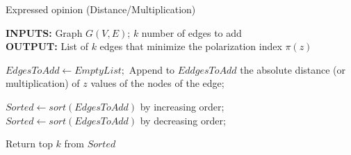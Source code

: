 \begin{algorithm}[H]
	\caption{Expressed opinion (Distance/Multiplication)}
	\label{alg:expreDisMiss}
	
	\begin{flushleft}
        		\textbf{INPUTS:} Graph $G(V, E)$; $k$ number of edges to add\\
		\vspace{6pt}
        		\textbf{OUTPUT:} List of $k$ edges that minimize the polarization index $\pi(z)$
	\end{flushleft}
	
	\begin{algorithmic}[1]
		\STATE $EdgesToAdd \leftarrow Empty List;$
			\STATE Append to $EddgesToAdd$ the absolute distance (or multiplication) of $z$ values of the nodes of the edge;
		\ENDFOR
		
			\STATE $Sorted \leftarrow sort(EdgesToAdd)$ by increasing order;
		\ELSE 
			\STATE $Sorted \leftarrow sort(EdgesToAdd)$ by decreasing order;
		\ENDIF

		\STATE Return top $k$ from $Sorted$
	\end{algorithmic}
	
\end{algorithm}

\clearpage




